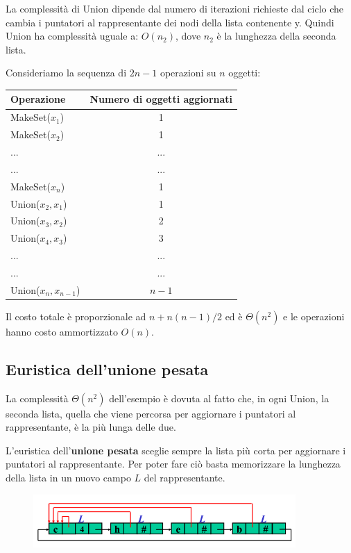 La complessità di Union dipende dal numero di iterazioni richieste dal ciclo che cambia i puntatori al rappresentante dei nodi della lista contenente y. Quindi Union ha complessità uguale a: $O(n_2)$, dove $n_2$ è la lunghezza della seconda lista.

Consideriamo la sequenza di $2n-1$ operazioni su $n$ oggetti:
\linebreak
\linebreak

\begin{tabular}[htpd]{l c}
\centering

Operazione & Numero di oggetti aggiornati \\
\hline
MakeSet($x_1$) & 1 \\
MakeSet($x_2$) & 1 \\
... & ... \\
... & ... \\
MakeSet($x_n$) & 1 \\
Union($x_2,x_1$) & 1 \\
Union($x_3,x_2$) & 2 \\
Union($x_4,x_3$) & 3 \\
... & ... \\
... & ... \\
Union($x_n,x_{n-1}$) & $n-1$ \\

\end{tabular}

Il costo totale è proporzionale ad $n+n(n-1)/2$ ed è $\Theta(n^2)$ e le operazioni hanno costo ammortizzato $O(n)$.

\subsection{Euristica dell'unione pesata}

La complessità $\Theta(n^2)$ dell'esempio è dovuta al fatto che, in ogni Union, la seconda lista, quella che viene percorsa per aggiornare i puntatori al rappresentante, è la più lunga delle due.

L'euristica dell'\textbf{unione pesata} sceglie sempre la lista più corta per aggiornare i puntatori al rappresentante. Per poter fare ciò basta memorizzare la lunghezza della lista in un nuovo campo $L$ del rappresentante.

\begin{figure}[htpd]
\centering
\includegraphics[width=100mm]{images/euristic1.png}
\end{figure}


